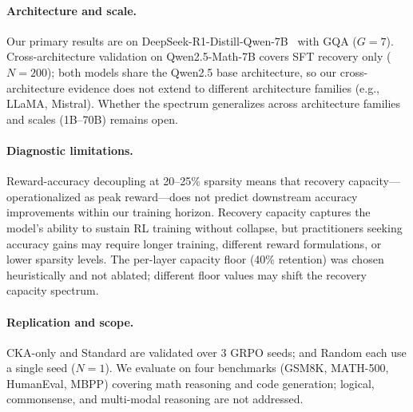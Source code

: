 
\paragraph{Architecture and scale.}
Our primary results are on DeepSeek-R1-Distill-Qwen-7B~\citep{deepseek2025r1} with GQA ($G{=}7$).
Cross-architecture validation on Qwen2.5-Math-7B covers SFT recovery only ($N{=}200$); both models share the Qwen2.5 base architecture, so our cross-architecture evidence does not extend to different architecture families (e.g., LLaMA, Mistral).
Whether the spectrum generalizes across architecture families and scales (1B--70B) remains open.

\paragraph{Diagnostic limitations.}
Reward-accuracy decoupling at 20--25\% sparsity means that recovery capacity---operationalized as peak reward---does not predict downstream accuracy improvements within our training horizon.
Recovery capacity captures the model's ability to sustain RL training without collapse, but practitioners seeking accuracy gains may require longer training, different reward formulations, or lower sparsity levels.
The per-layer capacity floor (40\% retention) was chosen heuristically and not ablated; different floor values may shift the recovery capacity spectrum.

\paragraph{Replication and scope.}
CKA-only and Standard are validated over 3 GRPO seeds; \rasp{} and Random each use a single seed ($N{=}1$).
We evaluate on four benchmarks (GSM8K, MATH-500, HumanEval, MBPP) covering math reasoning and code generation; logical, commonsense, and multi-modal reasoning are not addressed.
